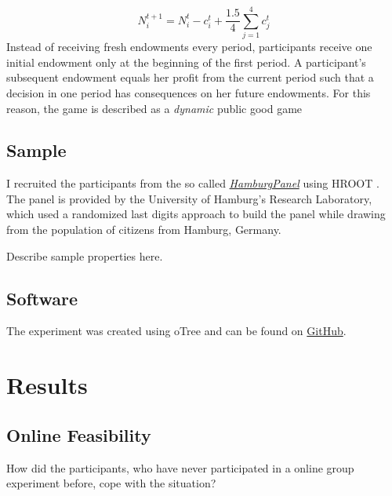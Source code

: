 \documentclass[
  authoryear,
  preprint,
  3p]{elsarticle}
\begin{document}
\[
N_i^{t+1}=N_i^t - c_i^t + \frac{1.5}{4}\sum_{j=1}^4 c_j^t
\] Instead of receiving fresh endowments every period, participants
receive one initial endowment only at the beginning of the first period.
A participant's subsequent endowment equals her profit from the current
period such that a decision in one period has consequences on her future
endowments. For this reason, the game is described as a \emph{dynamic}
public good game

\hypertarget{sample}{%
\subsection{Sample}\label{sample}}

I recruited the participants from the so called
\emph{\href{https://www.wiso.uni-hamburg.de/forschung/forschungslabor/umfragelabor/aktuelle-umfragen/hamburgpanel.html}{HamburgPanel}}
using HROOT \citep{hroot}. The panel is provided by the University of
Hamburg's Research Laboratory, which used a randomized last digits
approach to build the panel while drawing from the population of
citizens from Hamburg, Germany.

Describe sample properties here.

\hypertarget{software}{%
\subsection{Software}\label{software}}

The experiment was created using oTree \citep{oTree} and can be found on
\href{https://github.com/Howquez/coopUncertainty}{GitHub}.

\hypertarget{results}{%
\section{Results}\label{results}}

\hypertarget{online-feasibility}{%
\subsection{Online Feasibility}\label{online-feasibility}}

How did the participants, who have never participated in a online group
experiment before, cope with the situation?
\end{document}
